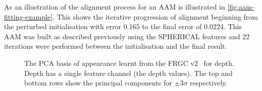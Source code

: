 As an illustration of the alignment process for an AAM is illustrated in
\cref{fig:aam-fitting-example}. This shows the iterative progression of alignment
beginning from the perturbed initialisation with error $0.165$ to the final
error of $0.0224$. This AAM was built as described previously using the SPHERICAL
features and 22 iterations were performed between the initialisation and
the final result.
\setlength{\tabcolsep}{2pt}
\begin{figure}
    \centering
    \caption{The PCA basis of appearance learnt from the
             FRGC v2~\cite{phillips2005overview} for depth.
             Depth has a single feature channel (the depth values).
             The top and bottom rows
             show the principal components for $\pm 3 \sigma$ respectively.}
\label{fig:single_img_2d_aam_appearance_depth}
\end{figure}
\setlength{\tabcolsep}{6pt}
